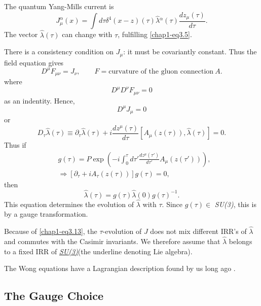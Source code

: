 The quantum Yang-Mills current is
\begin{equation}
J_\mu^\alpha (x) = \int d \tau \delta^4 (x -z) (\tau) \hat{\lambda} {}^\alpha (\tau) \frac{dz_\mu (\tau)}{d \tau}. \label{chap1-eq3.6}
\end{equation}
The vector $\hat{\lambda} (\tau)$ can change with $\tau$, fulfilling \eqref{chap1-eq3.5}.

There is a consistency condition on $J_\mu$: it must be covariantly constant. Thus the field equation gives
\begin{equation}
D^\mu F_{\mu \nu} = J_\nu, \qquad F= \text{curvature of the gluon connection}~ A. \label{chap1-eq3.7}
\end{equation}
where
\begin{equation}
D^\mu D^\nu F_{\mu \nu}=0 \label{chap1-eq3.8}
\end{equation}
as an indentity. Hence,
\begin{equation}
D^\mu J_\mu =0 \label{chap1-eq3.9}
\end{equation}
or
\begin{equation}
D_\tau \hat{\lambda} (\tau) \equiv \partial_\tau \hat{\lambda} (\tau) + i \frac{dz^\mu(\tau)}{d \tau} \left[A_\mu (z(\tau)), \hat{\lambda}(\tau)\right] =0. \label{chap1-eq3.10}
\end{equation}
Thus if
\begin{align}
  & g(\tau) = P \exp \left(-i \int^\tau_0 d \tau' \frac{dz^\mu(\tau')}{d \tau'} A_\mu (z(\tau')) \right), \label{chap1-eq3.11}\\
  & \Longrightarrow [\partial_\tau +i A_\tau (z(\tau))] g (\tau)=0, \label{chap1-eq3.12}
\end{align}
then
\begin{equation}
\hat{\lambda} (\tau) = g (\tau) \hat{\lambda} (0) g (\tau)^{-1}. \label{chap1-eq3.13}
\end{equation}
This equation determines the evolution of $\hat{\lambda}$ with $\tau$. Since $g(\tau) \in$ \textit{SU(3)}, this is by a gauge transformation.

Because of \eqref{chap1-eq3.13}, the $\tau$-evolution of $J$ does not mix different IRR's of $\hat{\lambda}$ and commutes with the Casimir invariants. We therefore assume that $\hat{\lambda}$ belongs to a fixed IRR of \ul{\textit{SU(3)}}(the underline denoting Lie algebra).

The Wong equations have a Lagrangian description found by us long ago \cite{key12}.

\subsection{The Gauge Choice}\label{chap1-sec3.1}

